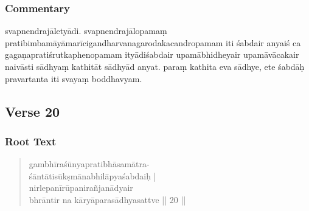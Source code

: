 \documentclass[12pt]{article}
\begin{document}
\subsubsection{Commentary}
\noindent svapnendrajāletyādi. svapnendrajālopamaṃ pratibimbamāyāmarīcigandharvanagarodakacandropamam iti śabdair anyaiś ca gagaṇapratiśrutkaphenopamam ityādiśabdair upamābhidheyair upamāvācakair naivāsti sādhyaṃ kathitāt sādhyād anyat. paraṃ kathita eva sādhye, ete śabdāḥ pravartanta iti svayaṃ boddhavyam.

% 
% 

\subsection{Verse 20}
\subsubsection{Root Text}
\begin{quote}
	gambhīraśūnyapratibhāsamātra-\footnoteB{
		°mātra°] \EDD ; mātraṃ \MS
	}\\
	śāntāti\footnoteB{
		śāntāti] \EDD ; sāntādi \MS
	}sūkṣmānabhilāpyaśabdaiḥ |\\
	nirlepanīrūpa\footnoteB{
		nirlepanīrūpa°] \EDD\ (\emd) ; nirlepanīpa \MS
	}nirañjanādyair \\
	bhrāntir na kāryāparasādhyasattve || 20 ||
% 
\end{quote}
\end{document}
